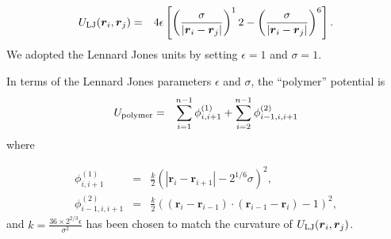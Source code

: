 \documentclass[entropy,article,submit,moreauthors,pdftex,10pt,a4paper]{Definitions/mdpi}
\begin{document}
\begin{eqnarray}
U_{\rm LJ}(\boldsymbol{r}_i, \boldsymbol{r}_j)
&=& 4\epsilon
\left[
\left(\frac{\sigma}{|\boldsymbol{r}_i - \boldsymbol{r}_j|}\right)^12 -
\left(\frac{\sigma}{|\boldsymbol{r}_i - \boldsymbol{r}_j|}\right)^6
\right].
\end{eqnarray}
We adopted the Lennard Jones units by setting $\epsilon=1$ and $\sigma=1$.

In terms of the Lennard Jones parameters $\epsilon$ and $\sigma$, the
``polymer'' potential is
\begin{eqnarray}
U_{\rm polymer} &=&
\sum_{i=1}^{n-1} \phi^{(1)}_{i,i+1} + \sum_{i=2}^{n-1} \phi^{(2)}_{i-1, i, i+1}
\end{eqnarray}
where

\begin{eqnarray}
\phi^{(1)}_{i,i+1} &=& \frac{k}{2}\left(|\boldsymbol{r}_i - \boldsymbol{r}_{i+1}|- 2^{1/6}\sigma\right)^2,\\
\phi^{(2)}_{i-1, i, i+1} &=& \frac{k}{2}
\left((\boldsymbol{r}_i - \boldsymbol{r}_{i-1})\cdot(\boldsymbol{r}_{i-1} - \boldsymbol{r}_{i}) - 1\right)^2,
\end{eqnarray}
and $k=\frac{36 \times 2^{2/3}\epsilon}{\sigma^2}$ has been chosen to match
the curvature of $U_{\rm LJ}(\boldsymbol{r}_i, \boldsymbol{r}_j)$.




\end{document}

